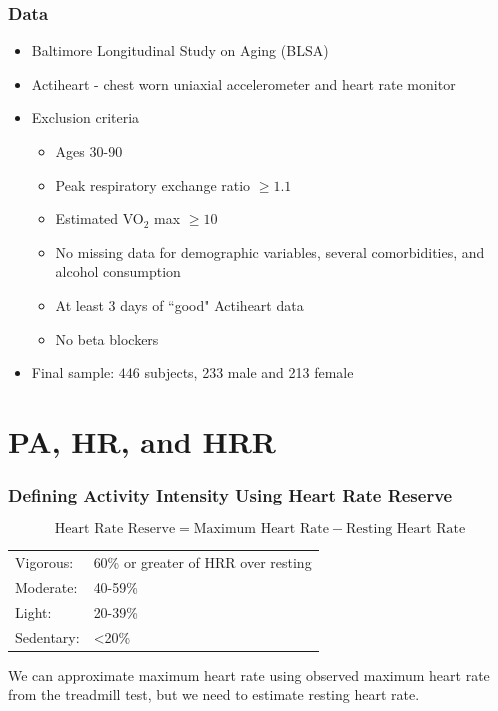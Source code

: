 \documentclass[10pt]{beamer}\usepackage[]{graphicx}\usepackage[]{color}
\begin{document}
\begin{frame}
\frametitle{Data}
\begin{itemize}
\item Baltimore Longitudinal Study on Aging (BLSA) 
\item Actiheart - chest worn uniaxial accelerometer and heart rate monitor 
\item Exclusion criteria
        \begin{itemize}
        \item Ages 30-90
        \item Peak respiratory exchange ratio $\geq 1.1$ 
        \item Estimated VO$_2$ max $\geq 10$ 
        \item No missing data for demographic variables, several comorbidities, and alcohol consumption
        \item At least 3 days of ``good" Actiheart data
        \item No beta blockers
        \end{itemize}
\item Final sample: $446$ subjects, 233 male and 213 female 
\end{itemize}
\end{frame}



\section{PA, HR, and HRR}

\begin{frame}
\frametitle{Defining Activity Intensity Using Heart Rate Reserve}

\begin{equation*}
\text{Heart Rate Reserve} = \text{Maximum Heart Rate} - \text{Resting Heart Rate}
\end{equation*}

\begin{center}
\begin{tabular}{ll}
Vigorous:& 60\% or greater of HRR over resting  \\
Moderate:& 40-59\%  \\ 
Light:&    20-39\% \\
Sedentary:& <20\%
\end{tabular}
\end{center}

We can approximate maximum heart rate using observed maximum heart rate from the treadmill test, but
we need to estimate resting heart rate.

\end{frame}
\end{document}

